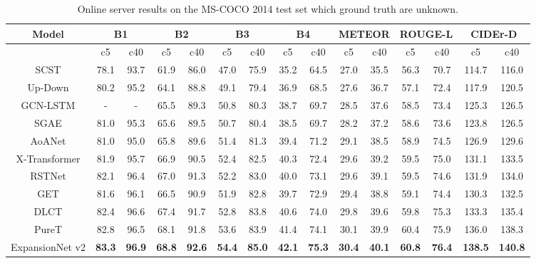 \begin{table*}[htb!]
  \scriptsize
  \center
  \caption{Online server results on the MS-COCO 2014 test set which ground truth are unknown.}
  \begin{tabular}{| c | c  c |  c  c |  c  c | c  c | c  c | c  c | c  c |}
 \hline
 {Model} & \multicolumn{2}{c|}{B1} & \multicolumn{2}{c|}{B2} &\multicolumn{2}{c|}{ B3} & \multicolumn{2}{c|}{B4} & \multicolumn{2}{c|}{METEOR} & \multicolumn{2}{c|}{ROUGE-L} & \multicolumn{2}{c|}{CIDEr-D}\\
 \hline
 {} & c5 & c40 & c5 & c40 & c5 & c40 & c5 & c40 & c5 & c40 & c5 & c40 & c5 & c40\\
 \hline
 SCST \cite{rennie2017self} & 78.1 & 93.7 & 61.9 & 86.0 & 47.0 & 75.9 & 35.2 & 64.5 & 27.0 & 35.5 & 56.3 & 70.7 & 114.7 & 116.0 \\
 \hline
 Up-Down \cite{anderson2018bottom}   & 80.2 & 95.2 & 64.1 & 88.8 & 49.1 & 79.4 & 36.9 & 68.5 & 27.6 & 36.7 & 57.1 & 72.4 & 117.9 & 120.5\\
 \hline
 GCN-LSTM \cite{yao2018exploring} & - & - & 
 65.5 & 89.3 & 50.8 & 80.3 & 38.7 & 69.7 & 28.5 & 37.6 & 58.5 &
 73.4 & 125.3 & 126.5 \\
 \hline
 SGAE \cite{yang2019auto}& 81.0 & 95.3 &
 65.6 & 89.5 & 50.7 & 80.4 & 38.5 & 69.7 & 28.2 & 37.2 & 58.6 & 73.6 & 123.8 & 126.5 \\
 \hline
 AoANet \cite{huang2019attention}& 81.0 & 95.0 &
 65.8 & 89.6 & 51.4 & 81.3 & 39.4 & 71.2 & 29.1 & 38.5 & 58.9 & 74.5 & 126.9 & 129.6 \\
 \hline
 X-Transformer \cite{pan2020x} & 81.9 & 95.7 & 66.9 & 90.5 & 52.4 & 82.5 & 40.3 & 72.4 & 29.6 & 39.2 & 59.5 & 75.0 & 131.1 & 133.5 \\
 \hline
 RSTNet \cite{zhang2021rstnet} & 82.1 & 96.4 & 67.0 & 91.3 & 52.2 & 83.0 & 40.0 & 73.1 & 29.6 & 39.1 & 59.5 & 74.6 & 131.9 & 134.0 \\
 \hline
 GET \cite{ji2021improving} & 81.6 & 96.1 & 66.5 & 90.9 & 51.9 & 82.8 & 39.7 & 72.9 & 29.4 & 38.8 & 59.1 & 74.4 & 130.3 & 132.5 \\
 \hline
 DLCT \cite{luo2021dual} & 82.4 & 96.6 & 67.4 & 91.7 & 52.8 & 83.8 & 40.6 & 74.0 & 29.8 & 39.6 & 59.8 & 75.3 & 133.3 & 135.4 \\
 \hline
 PureT \cite{wang2022end} & 82.8 & 96.5 & 68.1 & 91.8 & 53.6 & 83.9 & 41.4 & 74.1 & 30.1 & 39.9 & 60.4 & 75.9 & 136.0 & 138.3 \\
 \Xhline{1.5\arrayrulewidth}
ExpansionNet v2 & \textbf{83.3} & \textbf{96.9} & \textbf{68.8} & \textbf{92.6} & \textbf{54.4} & \textbf{85.0} & \textbf{42.1} & \textbf{75.3} & \textbf{30.4} & \textbf{40.1} & \textbf{60.8} & \textbf{76.4} & \textbf{138.5} & \textbf{140.8} \\
 \hline
 \end{tabular}
  \label{tab:online_table_eval}
\end{table*} 


